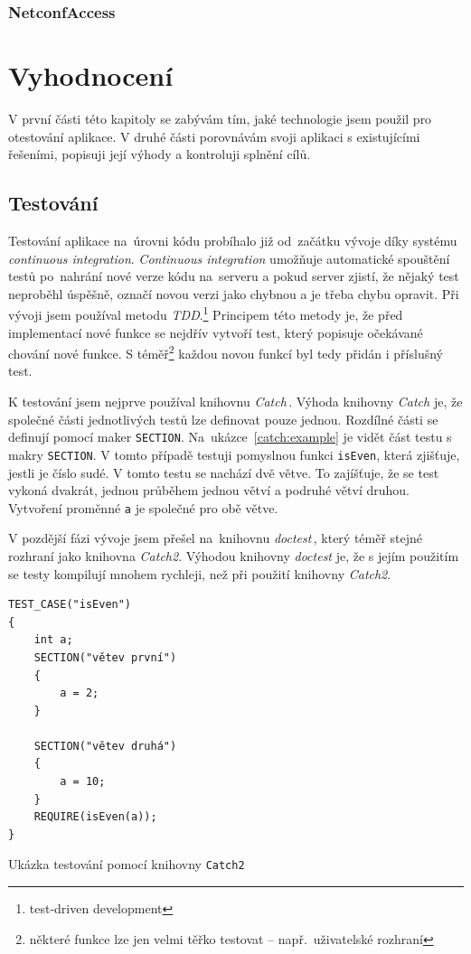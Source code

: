 \documentclass[thesis=B,czech,hidelinks]{FITthesis}[2019/03/06]
\begin{document}
\subsection{NetconfAccess}


\chapter{Vyhodnocení}
V první části této kapitoly se zabývám tím, jaké technologie jsem použil pro otestování aplikace. V druhé části porovnávám svoji aplikaci s existujícími řešeními, popisuji její výhody a kontroluji splnění cílů.
\section{Testování}
Testování aplikace na~úrovni kódu probíhalo již od~začátku vývoje díky systému \textit{continuous integration}. \textit{Continuous integration} umožňuje automatické spouštění testů po~nahrání nové verze kódu na~serveru a pokud server zjistí, že nějaký test neproběhl úspěšně, označí novou verzi jako chybnou a je třeba chybu opravit. Při vývoji jsem používal metodu \textit{TDD}.\footnote{test-driven development} Principem této metody je, že před implementací nové funkce se nejdřív vytvoří test, který popisuje očekávané chování nové funkce. S téměř\footnote{některé funkce lze jen velmi těřko testovat -- např.\ uživatelské rozhraní} každou novou funkcí byl tedy přidán i příslušný test.

K testování jsem nejprve používal knihovnu \textit{Catch}\,\cite{catch2}. Výhoda knihovny \textit{Catch} je, že společné části jednotlivých testů lze definovat pouze jednou. Rozdílné části se definují pomocí maker \texttt{SECTION}. Na~ukázce~\ref{catch:example} je vidět část testu s makry \texttt{SECTION}. V tomto případě testuji pomyslnou funkci \texttt{isEven}, která zjišťuje, jestli je číslo sudé. V tomto testu se nachází dvě větve. To zajíšťuje, že se test vykoná dvakrát, jednou průběhem jednou větví a podruhé větví druhou. Vytvoření proměnné \texttt{a} je společné pro obě větve.

V pozdější fázi vývoje jsem přešel na~knihovnu \textit{doctest}\,\cite{doctest}, který téměř stejné rozhraní jako knihovna \textit{Catch2}. Výhodou knihovny \textit{doctest} je, že s jejím použitím se testy kompilují mnohem rychleji, než při použití knihovny \textit{Catch2}.

\begin{listing}
\begin{verbatim}
TEST_CASE("isEven")
{
    int a;
    SECTION("větev první")
    {
        a = 2;
    }

    SECTION("větev druhá")
    {
        a = 10;
    }
    REQUIRE(isEven(a));
}
\end{verbatim}
\caption{Ukázka testování pomocí knihovny \texttt{Catch2}}\label{catch:example}
\end{listing}
\end{document}
